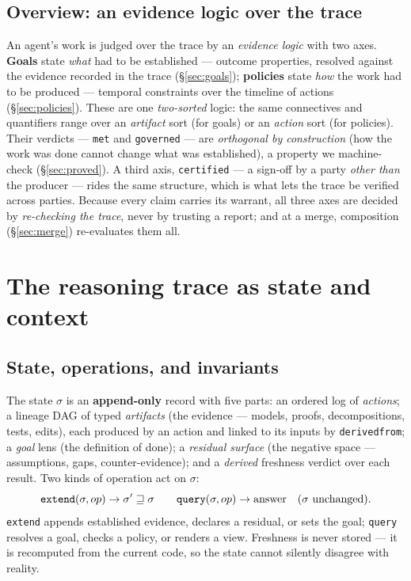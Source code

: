 \documentclass[11pt]{article}
\newcommand{\trace}{\ensuremath{\sigma}}
\newcommand{\codeus}{\textunderscore\penalty100\relax}
\newcommand{\code}[1]{\texttt{\let\_\codeus #1}}
\begin{document}
\subsection{Overview: an evidence logic over the trace}\label{sec:evidence-logic}

An agent's work is judged over the trace by an \emph{evidence logic} with two axes. \textbf{Goals} state
\emph{what} had to be established --- outcome properties, resolved against the evidence recorded in the trace
(\S\ref{sec:goals}); \textbf{policies} state \emph{how} the work had to be produced --- temporal constraints
over the timeline of actions (\S\ref{sec:policies}). These are one \emph{two-sorted} logic: the same
connectives and quantifiers range over an \emph{artifact} sort (for goals) or an \emph{action} sort (for
policies). Their verdicts --- \code{met} and \code{governed} --- are \emph{orthogonal by construction} (how
the work was done cannot change what was established), a property we machine-check (\S\ref{sec:proved}). A
third axis, \code{certified} --- a sign-off by a party \emph{other than} the producer --- rides the same
structure, which is what lets the trace be verified across parties. Because every claim carries its warrant,
all three axes are decided by \emph{re-checking the trace}, never by trusting a report; and at a merge,
composition (\S\ref{sec:merge}) re-evaluates them all.

\section{The reasoning trace as state and context}\label{sec:state}

\subsection{State, operations, and invariants}

The state \trace{} is an \textbf{append-only} record with five parts: an ordered log of \emph{actions}; a
lineage DAG of typed \emph{artifacts} (the evidence --- models, proofs, decompositions, tests, edits), each
produced by an action and linked to its inputs by \code{derived\_from}; a \emph{goal} lens (the definition
of done); a \emph{residual surface} (the negative space --- assumptions, gaps, counter-evidence); and a
\emph{derived} freshness verdict over each result. Two kinds of operation act on \trace{}:
\[
\text{\code{extend}}(\trace, op) \to \trace' \sqsupseteq \trace
\qquad
\text{\code{query}}(\trace, op) \to \text{answer} \quad (\trace \text{ unchanged}).
\]
\code{extend} appends established evidence, declares a residual, or sets the goal; \code{query} resolves a
goal, checks a policy, or renders a view. Freshness is never stored --- it is recomputed from the current
code, so the state cannot silently disagree with reality.
\end{document}
